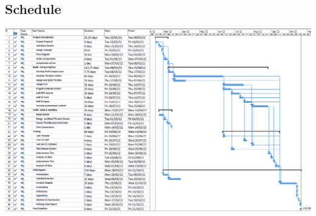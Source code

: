 \begin{landscape}
\normalsize
\section{Schedule}

	\includegraphics[width = \linewidth]{figures/Schedule.png}	


\end{landscape}